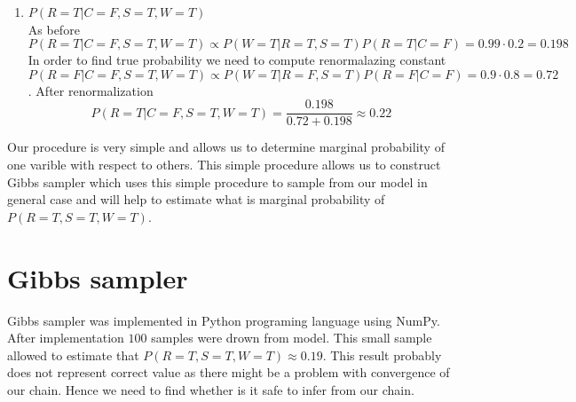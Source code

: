 \documentclass[12pt,a4paper]{article}
\begin{document}
\begin{enumerate}
    \item {\Large \textbf{$P(R=T|C=F,S=T,W=T)$}}\\
    As before
    \begin{equation*}
        P(R=T|C=F,S=T,W=T)\propto P(W=T|R=T,S=T)P(R=T|C=F)=0.99\cdot0.2=0.198
    \end{equation*}
    In order to find true probability we need to compute renormalazing constant
    \begin{equation*}
        P(R=F|C=F,S=T,W=T)\propto P(W=T|R=F,S=T)P(R=F|C=F)=0.9\cdot0.8=0.72
    \end{equation*}.
    After renormalization
    \begin{equation*}
        P(R=T|C=F,S=T,W=T)=\frac{0.198}{0.72+0.198}\approx0.22
    \end{equation*}
\end{enumerate}
Our procedure is very simple and allows us to determine marginal probability of one varible with respect to others.  This simple procedure
allows us to construct Gibbs sampler which uses this simple procedure to sample from our model in general case and will help to estimate what is marginal probability of
$P(R=T,S=T,W=T)$.
\section{Gibbs sampler}
\hspace{1cm} Gibbs sampler was implemented in Python programing language using NumPy. After implementation $100$ samples were drown from 
model. This small sample allowed to estimate that $P(R=T,S=T,W=T)\approx 0.19$. This result probably does not represent correct value as there might be a problem
with convergence of our chain. Hence we need to find whether is it safe to infer from our chain.
\end{document}
